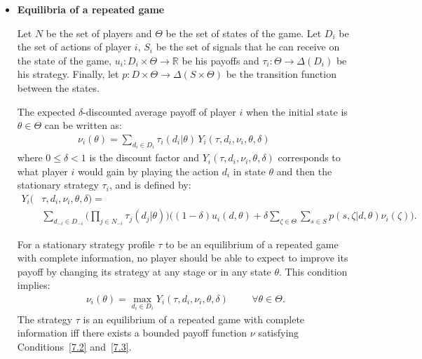 \documentclass{../ape}
\begin{document}
\begin{itemize}[leftmargin=*]
\renewcommand{\labelitemi}{$\bullet$}

	\item \textbf{Equilibria of a repeated game}
	\vspace{.3cm}

	Let $N$ be the set of players and $\Theta$ be the set of states of the game. Let $D_i$ be the set of actions of player $i$, $S_i$ be the set of signals that he can receive on the state of the game, $u_i : D_i \times \Theta \rightarrow \mathbb{R}$ be his payoffs and $\tau_i : \Theta \rightarrow \Delta(D_i)$ be his strategy. Finally, let $p : D \times \Theta \rightarrow \Delta(S \times \Theta)$ be the transition function between the states.
	
	The expected $\delta$-discounted average payoff of player $i$ when the initial state is $\theta \in \Theta$ can be written as:
	\begin{align}
		\nu_i(\theta) = \sum_{d_i \in D_i} \tau_i(d_i|\theta) \, Y_i(\tau , d_i , \nu_i , \theta , \delta) \hspace{1cm}
		\label{7.2}
	\end{align}
	where $0 \leq \delta < 1$ is the discount factor and $Y_i(\tau , d_i , \nu_i , \theta , \delta)$ corresponds to what player $i$ would gain by playing the action $d_i$ in state $\theta$ and then the stationary strategy $\tau_i$, and is defined by:
	\begin{align*}
		Y_i(&\tau , d_i , \nu_i , \theta , \delta) = \\ &\sum_{d_{-i} \in D_{-i}} \Bigg( \prod_{j \in N_{-i}} \tau_j(d_j|\theta) \Bigg)\Bigg( (1-\delta)u_i(d,\theta)+\delta \sum_{\zeta \in \Theta} \sum_{s \in S}p(s, \zeta|d,\theta)\nu_i(\zeta)\Bigg).
	\end{align*}
	
	For a stationary strategy profile $\tau$ to be an equilibrium of a repeated game with complete information, no player should be able to expect to improve its payoff by changing its strategy at any stage or in any state $\theta$. This condition implies:
	\begin{align}
		\nu_i(\theta)= \max_{d_i \in D_i} Y_i(\tau , d_i , \nu_i , \theta , \delta) \hspace{1cm} \forall \theta \in \Theta.
		\label{7.3}
	\end{align}
	The strategy $\tau$ is an equilibrium of a repeated game with complete information iff there exists a bounded payoff function $\nu$ satisfying Conditions~\eqref{7.2} and~\eqref{7.3}.

	\vspace{.3cm}

\end{itemize}
\end{document}
